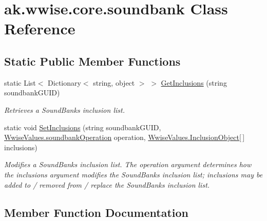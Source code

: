 \hypertarget{classak_1_1wwise_1_1core_1_1soundbank}{}\section{ak.\+wwise.\+core.\+soundbank Class Reference}
\label{classak_1_1wwise_1_1core_1_1soundbank}
\subsection*{Static Public Member Functions}
\begin{DoxyCompactItemize}
\item 
static List$<$ Dictionary$<$ string, object $>$ $>$ \mbox{\hyperlink{classak_1_1wwise_1_1core_1_1soundbank_a3e414d8069f93bf6422ba6efa663201a}{Get\+Inclusions}} (string soundbank\+G\+U\+ID)
\begin{DoxyCompactList}\small\item\em Retrieves a Sound\+Bank\textquotesingle{}s inclusion list. \end{DoxyCompactList}\item 
static void \mbox{\hyperlink{classak_1_1wwise_1_1core_1_1soundbank_ab076e1bbcb3c0deba565ce44d7b21aa7}{Set\+Inclusions}} (string soundbank\+G\+U\+ID, \mbox{\hyperlink{class_waapi_c_s_1_1_custom_values_1_1_wwise_values_a1b0c0844c7d8ac428022c97feeec0b5f}{Wwise\+Values.\+soundbank\+Operation}} operation, \mbox{\hyperlink{class_waapi_c_s_1_1_custom_values_1_1_wwise_values_1_1_inclusion_object}{Wwise\+Values.\+Inclusion\+Object}}\mbox{[}$\,$\mbox{]} inclusions)
\begin{DoxyCompactList}\small\item\em Modifies a Sound\+Bank\textquotesingle{}s inclusion list. The \textquotesingle{}operation\textquotesingle{} argument determines how the \textquotesingle{}inclusions\textquotesingle{} argument modifies the Sound\+Bank\textquotesingle{}s inclusion list; \textquotesingle{}inclusions\textquotesingle{} may be added to / removed from / replace the Sound\+Bank\textquotesingle{}s inclusion list. \end{DoxyCompactList}\end{DoxyCompactItemize}


\subsection{Member Function Documentation}
\mbox{\label{classak_1_1wwise_1_1core_1_1soundbank_a3e414d8069f93bf6422ba6efa663201a}} 
